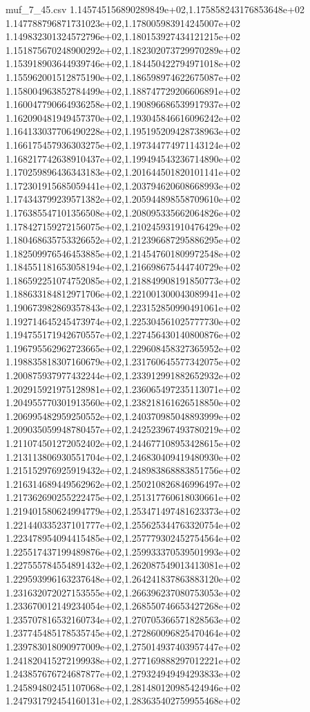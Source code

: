 \begin{filecontents*}{muf_7_45.csv}
1.145745156890289849e+02,1.175858243176853648e+02
1.147788796871731023e+02,1.178005983914245007e+02
1.149832301324572796e+02,1.180153927434121215e+02
1.151875670248900292e+02,1.182302073729970289e+02
1.153918903644939746e+02,1.184450422794971018e+02
1.155962001512875190e+02,1.186598974622675087e+02
1.158004963852784499e+02,1.188747729206606891e+02
1.160047790664936258e+02,1.190896686539917937e+02
1.162090481949457370e+02,1.193045846616096242e+02
1.164133037706490228e+02,1.195195209428738963e+02
1.166175457936303275e+02,1.197344774971143124e+02
1.168217742638910437e+02,1.199494543236714890e+02
1.170259896436343183e+02,1.201644501820101141e+02
1.172301915685059441e+02,1.203794620608668993e+02
1.174343799239571382e+02,1.205944898558709610e+02
1.176385547101356508e+02,1.208095335662064826e+02
1.178427159272156075e+02,1.210245931910476429e+02
1.180468635753326652e+02,1.212396687295886295e+02
1.182509976546453885e+02,1.214547601809972548e+02
1.184551181653058194e+02,1.216698675444740729e+02
1.186592251074752085e+02,1.218849908191850773e+02
1.188633184812971706e+02,1.221001300043089941e+02
1.190673982869357843e+02,1.223152850990491061e+02
1.192714645245473974e+02,1.225304561025777730e+02
1.194755171942670557e+02,1.227456430140800876e+02
1.196795562962723665e+02,1.229608458327365952e+02
1.198835818307160679e+02,1.231760645577342075e+02
1.200875937977432244e+02,1.233912991882652932e+02
1.202915921975128981e+02,1.236065497235113071e+02
1.204955770301913560e+02,1.238218161626518850e+02
1.206995482959250552e+02,1.240370985048893999e+02
1.209035059948780457e+02,1.242523967493780219e+02
1.211074501272052402e+02,1.244677108953428615e+02
1.213113806930551704e+02,1.246830409419480930e+02
1.215152976925919432e+02,1.248983868883851756e+02
1.216314689449562962e+02,1.250210826846996497e+02
1.217362690255222475e+02,1.251317760618030661e+02
1.219401580624994779e+02,1.253471497481623373e+02
1.221440335237101777e+02,1.255625344763320754e+02
1.223478954094415485e+02,1.257779302452754564e+02
1.225517437199489876e+02,1.259933370539501993e+02
1.227555784554891432e+02,1.262087549013413081e+02
1.229593996163237648e+02,1.264241837863883120e+02
1.231632072027153555e+02,1.266396237080753053e+02
1.233670012149234054e+02,1.268550746653427268e+02
1.235707816532160734e+02,1.270705366571828563e+02
1.237745485178535745e+02,1.272860096825470464e+02
1.239783018090977009e+02,1.275014937403957447e+02
1.241820415272199938e+02,1.277169888297012221e+02
1.243857676724687877e+02,1.279324949494293833e+02
1.245894802451107068e+02,1.281480120985424946e+02
1.247931792454160131e+02,1.283635402759955468e+02

\end{filecontents*}
